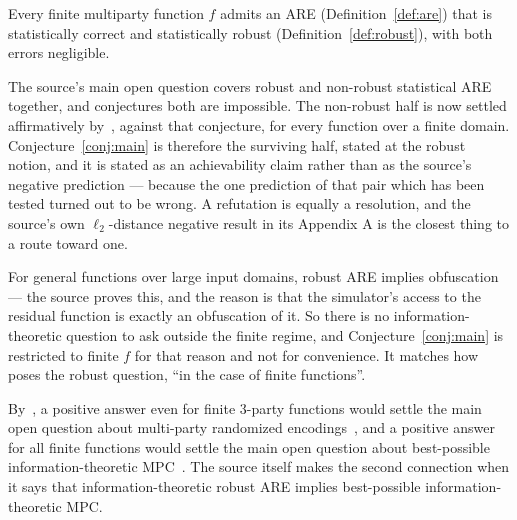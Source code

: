 \documentclass{conjura-conjecture}
\begin{document}
\begin{conjecture}\label{conj:main}
Every finite multiparty function $f$ admits an ARE
(Definition~\ref{def:are}) that is statistically correct and
statistically robust (Definition~\ref{def:robust}), with both errors
negligible.
\end{conjecture}

\begin{remark}\label{rem:half}
The source's main open question covers robust and non-robust statistical
ARE together, and conjectures both are impossible. The non-robust half is
now settled affirmatively by~\cite{BEGI25}, against that conjecture, for
every function over a finite domain. Conjecture~\ref{conj:main} is
therefore the surviving half, stated at the robust notion, and it is
stated as an achievability claim rather than as the source's negative
prediction --- because the one prediction of that pair which has been
tested turned out to be wrong. A refutation is equally a resolution, and
the source's own $\ell_{2}$-distance negative result in its Appendix A is
the closest thing to a route toward one.
\end{remark}

\begin{remark}
For general functions over large input domains, robust ARE implies
obfuscation --- the source proves this, and the reason is that the
simulator's access to the residual function is exactly an obfuscation of
it. So there is no information-theoretic question to ask outside the
finite regime, and Conjecture~\ref{conj:main} is restricted to finite $f$
for that reason and not for convenience. It matches how~\cite{BEGI25}
poses the robust question, ``in the case of finite functions''.
\end{remark}

\begin{remark}
By~\cite{BEGI25}, a positive answer even for finite $3$-party functions
would settle the main open question about multi-party randomized
encodings~\cite{ABT21}, and a positive answer for all finite functions
would settle the main open question about best-possible
information-theoretic MPC~\cite{HIKR18}. The source itself makes the
second connection when it says that information-theoretic robust ARE
implies best-possible information-theoretic MPC\@.
\end{remark}
\end{document}
